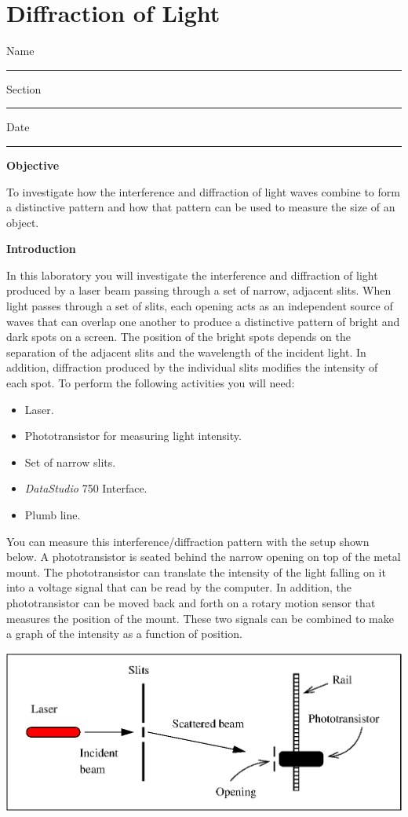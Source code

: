 
\section{Diffraction of Light}

Name \rule{2.0in}{0.1pt}\hfill{}Section \rule{1.0in}{0.1pt}\hfill{}Date
\rule{1.0in}{0.1pt}

\textbf{Objective}

To investigate how the interference and diffraction of light waves
combine to form a distinctive pattern and how that pattern can be
used to measure the size of an object.

\textbf{Introduction}

In this laboratory you will investigate the interference and diffraction
of light produced by a laser beam passing through a set of narrow,
adjacent slits. When light passes through a set of slits, each opening
acts as an independent source of waves that can overlap one another
to produce a distinctive pattern of bright and dark spots on a screen.
The position of the bright spots depends on the separation of the
adjacent slits and the wavelength of the incident light. In addition,
diffraction produced by the individual slits modifies the intensity
of each spot. To perform the following activities you will need:

\begin{itemize}
\item Laser.
\item Phototransistor for measuring light intensity.
\item Set of narrow slits.
\item {\it DataStudio} 750 Interface.
\item Plumb line.
\end{itemize}
You can measure this interference/diffraction pattern with the setup
shown below. A phototransistor is seated behind the narrow opening on top
of the metal mount. The phototransistor can translate the intensity
of the light falling on it into a voltage signal that can be read
by the computer. In addition, the phototransistor can be moved back and
forth on a rotary motion sensor that measures the position of the 
mount.
These two signals can be combined to
make a graph of the intensity as a function of position.

\vspace{0.3cm}
\begin{center}
\includegraphics{interference_of_light_fig1b.eps}
\end{center}
\vspace{0.3cm}

